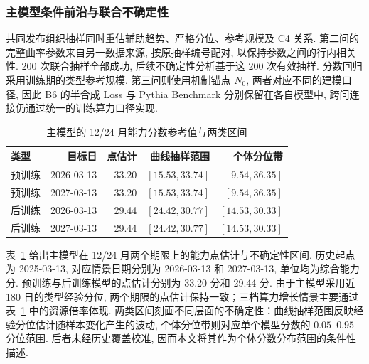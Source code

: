 \subsubsection{主模型条件前沿与联合不确定性}
共同发布组织抽样同时重估辅助趋势、严格分位、参考规模及 C4 关系. 第二问的完整曲率参数来自另一数据来源, 按原抽样编号配对, 以保持参数之间的行内相关性.  200 次联合抽样全部成功, 后续不确定性分析基于这 200 次有效抽样. 分数回归采用训练期的类型参考规模. 第三问则使用机制锚点 $N_0$, 两者对应不同的建模口径, 因此 B6 的半合成 Loss 与 Pythia Benchmark 分别保留在各自模型中, 跨问连接仍通过统一的训练算力口径实现.
\begin{table}[H]\centering\small
   \caption{主模型的 12/24 月能力分数参考值与两类区间}
   \label{tab:q4-v39-slowdown}
   
   \begin{tabular}{lrrrr}\toprule 类型 & 目标日        & 点估计   & 曲线抽样范围          & 个体分位带           \\\midrule
                预训练                & 2026-03-13 & 33.20 & $[15.53,33.74]$ & $[9.54,36.35]$  \\
                预训练                & 2027-03-13 & 33.20 & $[15.53,33.74]$ & $[9.54,36.35]$  \\
                后训练                & 2026-03-13 & 29.44 & $[24.42,30.77]$ & $[14.53,30.33]$ \\
                后训练                & 2027-03-13 & 29.44 & $[24.42,30.77]$ & $[14.53,30.33]$ \\
                \bottomrule\end{tabular}\end{table}

表~\ref{tab:q4-v39-slowdown} 给出主模型在 12/24 月两个期限上的能力点估计与不确定性区间. 历史起点为 2025-03-13, 对应情景日期分别为 2026-03-13 和 2027-03-13, 单位均为综合能力分. 预训练与后训练模型的点估计分别为 33.20 分和 29.44 分. 由于主模型采用近 180 日的类型经验分位, 两个期限的点估计保持一致；三档算力增长情景主要通过表~\ref{tab:q4-v39-slowdown} 中的资源倍率体现. 两类区间刻画不同层面的不确定性：曲线抽样范围反映经验分位估计随样本变化产生的波动, 个体分位带则对应单个模型分数的 $0.05$--$0.95$ 分位范围. 后者未经历史覆盖校准, 因而本文将其作为个体分数分布范围的条件性描述.


